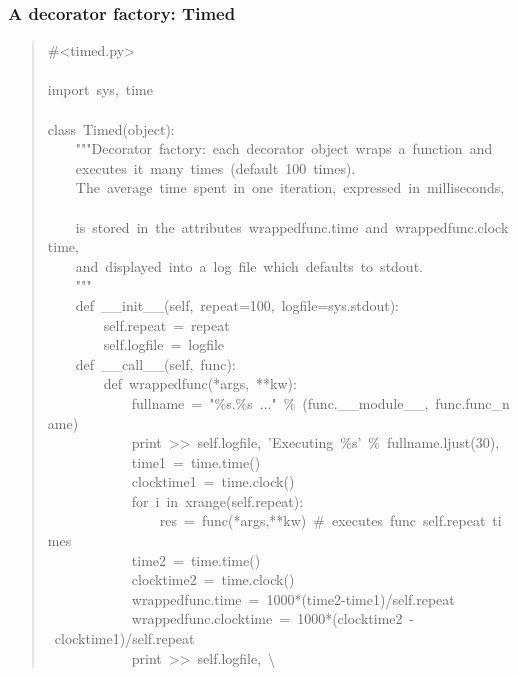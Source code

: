 \documentclass[10pt,a4paper,english]{article}
\begin{document}
\subsubsection*{A decorator factory: Timed}
\begin{quote}{\ttfamily \raggedright \noindent
{\#}<timed.py>~\\
~\\
import~sys,~time~\\
~\\
class~Timed(object):~\\
~~~~"{}"{}"Decorator~factory:~each~decorator~object~wraps~a~function~and~~\\
~~~~executes~it~many~times~(default~100~times).~\\
~~~~The~average~time~spent~in~one~iteration,~expressed~in~milliseconds,~~\\
~~~~is~stored~in~the~attributes~wrappedfunc.time~and~wrappedfunc.clocktime,~\\
~~~~and~displayed~into~a~log~file~which~defaults~to~stdout.~\\
~~~~"{}"{}"~\\
~~~~def~{\_}{\_}init{\_}{\_}(self,~repeat=100,~logfile=sys.stdout):~\\
~~~~~~~~self.repeat~=~repeat~\\
~~~~~~~~self.logfile~=~logfile~\\
~~~~def~{\_}{\_}call{\_}{\_}(self,~func):~\\
~~~~~~~~def~wrappedfunc(*args,~**kw):~\\
~~~~~~~~~~~~fullname~=~"{\%}s.{\%}s~..."~{\%}~(func.{\_}{\_}module{\_}{\_},~func.func{\_}name)~\\
~~~~~~~~~~~~print~>{}>~self.logfile,~'Executing~{\%}s'~{\%}~fullname.ljust(30),~\\
~~~~~~~~~~~~time1~=~time.time()~\\
~~~~~~~~~~~~clocktime1~=~time.clock()~\\
~~~~~~~~~~~~for~i~in~xrange(self.repeat):~\\
~~~~~~~~~~~~~~~~res~=~func(*args,**kw)~{\#}~executes~func~self.repeat~times~\\
~~~~~~~~~~~~time2~=~time.time()~\\
~~~~~~~~~~~~clocktime2~=~time.clock()~\\
~~~~~~~~~~~~wrappedfunc.time~=~1000*(time2-time1)/self.repeat~\\
~~~~~~~~~~~~wrappedfunc.clocktime~=~1000*(clocktime2~-~clocktime1)/self.repeat~\\
~~~~~~~~~~~~print~>{}>~self.logfile,~{\textbackslash}~\\
}
\end{quote}
\end{document}
